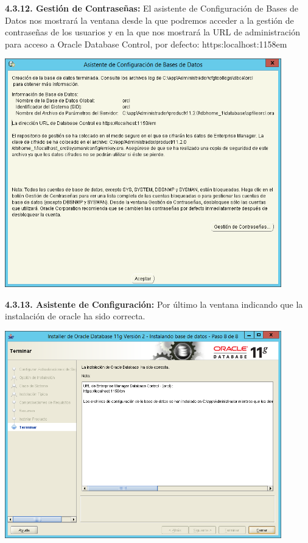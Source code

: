 \textbf {4.3.12. Gestión de Contraseñas:} El asistente de Configuración de Bases de Datos nos mostrará la ventana desde la que podremos acceder a la gestión de contraseñas de los usuarios y en la que nos mostrará la URL de administración para acceso a Oracle Database Control, por defecto: https:\/\/localhost:1158\/em
\begin{center}
  \includegraphics[width=12cm]{Imagenes/Gestion_Contrasenas.png}
\end{center}
\break

\textbf {4.3.13. Asistente de Configuración:} Por último la ventana indicando que la instalación de oracle ha sido correcta.
\begin{center}
  \includegraphics[width=12cm]{Imagenes/Instalacion_Correcta.png}
\end{center}

